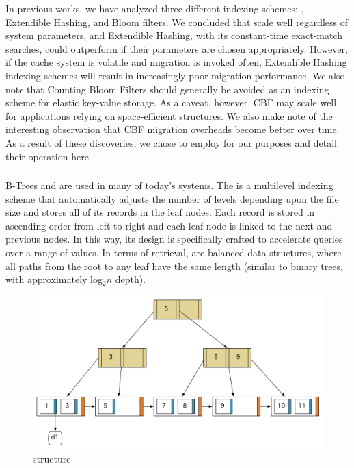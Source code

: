 In previous works\cite{chiu_ccgrid11,chiu_ijngc11}, we have analyzed three
different indexing schemes: \bptrees, Extendible Hashing, and Bloom filters. We
concluded that \bptrees scale well regardless of system parameters, and
Extendible Hashing, with its constant-time exact-match searches, could
outperform \bptrees if their parameters are chosen appropriately. However, if
the cache system is volatile and migration is invoked often, Extendible Hashing
indexing schemes will result in increasingly poor migration performance. We
also note that Counting Bloom Filters should generally be avoided as an
indexing scheme for elastic key-value storage. As a caveat, however, CBF may
scale well for applications relying on space-efficient structures. We also make
note of the interesting observation that CBF migration overheads become better
over time. As a result of these discoveries, we chose to employ \bptrees for
our purposes and detail their operation here.

\subsubsection{\bptrees} %
\label{subsub:b_trees}
B-Trees and \bptrees are used in many of today's systems. The \bptree is a
multilevel indexing scheme that automatically adjusts the number of levels
depending upon the file size and stores all of its records in the leaf nodes.
Each record is stored in ascending order from left to right and each leaf node
is linked to the next and previous nodes. In this way, its design is
specifically crafted to accelerate queries over a range of
values\cite{navathe,ullman}. In terms of retrieval, \bptrees are balanced data
structures, where all paths from the root to any leaf have the same length
(similar to binary trees, with approximately log$_2 n$ depth).

\begin{figure}
\begin{center}
\includegraphics[scale=0.5]{figures/bplustree.pdf}
\end{center}
\caption{\bptree structure}
\label{fig:bplustree}
\end{figure}

